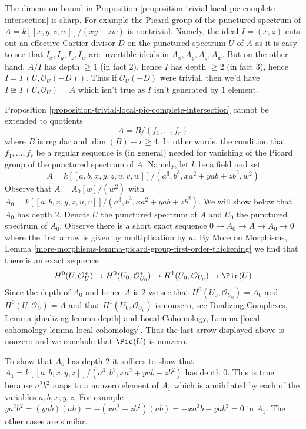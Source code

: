 \begin{example}
\label{example-grothendieck-sharp}
The dimension bound in
Proposition \ref{proposition-trivial-local-pic-complete-intersection}
is sharp. For example the Picard group of the punctured spectrum of
$A = k[[x, y, z, w]]/(xy - zw)$ is nontrivial. Namely, the
ideal $I = (x, z)$ cuts out an effective Cartier divisor $D$ on the punctured
spectrum $U$ of $A$ as it is easy to see that $I_x, I_y, I_z, I_w$
are invertible ideals in $A_x, A_y, A_z, A_w$. But on the other hand,
$A/I$ has depth $\geq 1$ (in fact $2$), hence $I$ has depth $\geq 2$
(in fact $3$), hence
$I = \Gamma(U, \mathcal{O}_U(-D))$. Thus if $\mathcal{O}_U(-D)$
were trivial, then we'd have $I \cong \Gamma(U, \mathcal{O}_U) = A$
which isn't true as $I$ isn't generated by $1$ element.
\end{example}

\begin{example}
\label{example-grothendieck-sharp-bis}
Proposition \ref{proposition-trivial-local-pic-complete-intersection}
cannot be extended to quotients
$$
A = B/(f_1, \ldots, f_r)
$$
where $B$ is regular and $\dim(B) - r \geq 4$. In other words, the condition
that $f_1, \ldots, f_r$ be a regular sequence is (in general) needed
for vanishing of the Picard group of the punctured spectrum of $A$.
Namely, let $k$ be a field and set
$$
A = k[[a, b, x, y, z, u, v, w]]/(a^3, b^3, xa^2 + yab + zb^2, w^2)
$$
Observe that $A = A_0[w]/(w^2)$ with
$A_0 = k[[a, b, x, y, z, u, v]]/(a^3, b^3, xa^2 + yab + zb^2)$.
We will show below that $A_0$ has depth $2$.
Denote $U$ the punctured spectrum of $A$ and $U_0$ the punctured
spectrum of $A_0$. Observe there is a short exact sequence
$0 \to A_0 \to A \to A_0 \to 0$ where the first arrow is
given by multiplication by $w$.
By More on Morphisms, Lemma
\ref{more-morphisms-lemma-picard-group-first-order-thickening}
we find that there is an exact sequence
$$
H^0(U, \mathcal{O}_U^*) \to
H^0(U_0, \mathcal{O}_{U_0}^*) \to
H^1(U_0, \mathcal{O}_{U_0}) \to
\Pic(U)
$$
Since the depth of $A_0$ and hence $A$ is $2$ we see that
$H^0(U_0, \mathcal{O}_{U_0}) = A_0$ and $H^0(U, \mathcal{O}_U) = A$
and that $H^1(U_0, \mathcal{O}_{U_0})$ is nonzero, see
Dualizing Complexes, Lemma \ref{dualizing-lemma-depth} and
Local Cohomology, Lemma \ref{local-cohomology-lemma-local-cohomology}.
Thus the last arrow displayed above is nonzero and we conclude
that $\Pic(U)$ is nonzero.

\medskip\noindent
To show that $A_0$ has depth $2$ it suffices to show that
$A_1 = k[[a, b, x, y, z]]/(a^3, b^3, xa^2 + yab + zb^2)$
has depth $0$. This is true because $a^2b^2$ maps to
a nonzero element of $A_1$ which is annihilated
by each of the variables $a, b, x, y, z$. For example
$ya^2b^2 = (yab)(ab) = - (xa^2 + zb^2)(ab) = -xa^3b - yab^3 = 0$ in $A_1$.
The other cases are similar.
\end{example}










